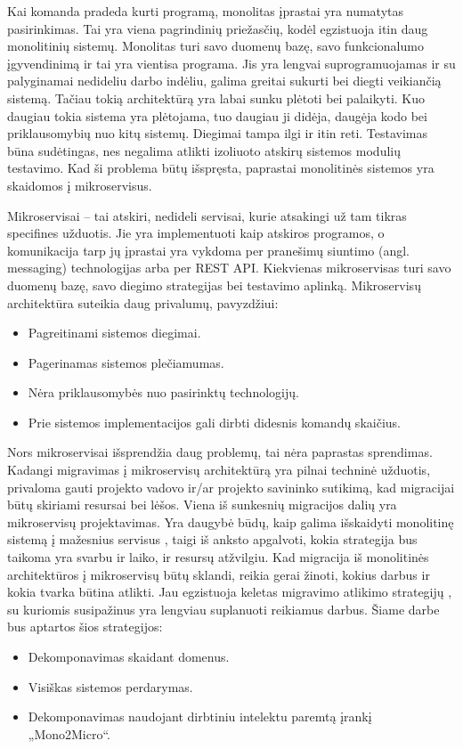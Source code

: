\documentclass[fleqn]{VUMIFPSkursinis}
\begin{document}
Kai komanda pradeda kurti programą, monolitas įprastai yra numatytas pasirinkimas. Tai yra viena pagrindinių priežasčių, kodėl egzistuoja itin daug monolitinių sistemų. Monolitas turi savo duomenų bazę, savo funkcionalumo įgyvendinimą ir tai yra vientisa programa. Jis yra lengvai suprogramuojamas ir su palyginamai nedideliu darbo indėliu, galima greitai sukurti bei diegti veikiančią sistemą. Tačiau tokią architektūrą yra labai sunku plėtoti bei palaikyti. Kuo daugiau  tokia sistema yra plėtojama, tuo daugiau ji didėja, daugėja kodo bei priklausomybių nuo kitų sistemų. Diegimai tampa ilgi ir itin reti. Testavimas būna sudėtingas, nes negalima atlikti izoliuoto atskirų sistemos modulių testavimo. Kad ši problema būtų išspręsta, paprastai monolitinės sistemos yra skaidomos į mikroservisus.

Mikroservisai – tai atskiri, nedideli servisai, kurie atsakingi už tam tikras specifines užduotis. Jie yra implementuoti kaip atskiros programos, o komunikacija tarp jų įprastai yra vykdoma per pranešimų siuntimo (angl. messaging) technologijas arba per REST API. Kiekvienas mikroservisas turi savo duomenų bazę, savo diegimo strategijas bei testavimo aplinką. Mikroservisų architektūra suteikia daug privalumų, pavyzdžiui:
\begin{itemize}
    \item Pagreitinami sistemos diegimai.
    \item Pagerinamas sistemos plečiamumas.
    \item Nėra priklausomybės nuo pasirinktų technologijų.
    \item Prie sistemos implementacijos gali dirbti didesnis komandų skaičius.
\end{itemize}

Nors mikroservisai išsprendžia daug problemų, tai nėra paprastas sprendimas. Kadangi migravimas į mikroservisų architektūrą yra pilnai techninė užduotis, privaloma gauti projekto vadovo ir/ar projekto savininko sutikimą, kad migracijai būtų skiriami resursai bei lėšos. Viena iš sunkesnių migracijos dalių yra mikroservisų projektavimas. Yra daugybė būdų, kaip galima išskaidyti monolitinę sistemą į mažesnius servisus \cite{FBZ+19}, taigi iš anksto apgalvoti, kokia strategija bus taikoma yra svarbu ir laiko, ir resursų atžvilgiu. Kad migracija iš monolitinės architektūros į mikroservisų būtų sklandi, reikia gerai žinoti, kokius darbus ir kokia tvarka būtina atlikti. Jau egzistuoja keletas migravimo atlikimo strategijų \cite{Wal22,MQO18,KXL+20}, su kuriomis susipažinus yra lengviau suplanuoti reikiamus darbus. Šiame darbe bus aptartos šios strategijos:
\begin{itemize}
    \item Dekomponavimas skaidant domenus.
    \item Visiškas sistemos perdarymas.
    \item Dekomponavimas naudojant dirbtiniu intelektu paremtą įrankį „Mono2Micro“.
\end{itemize}
\end{document}
